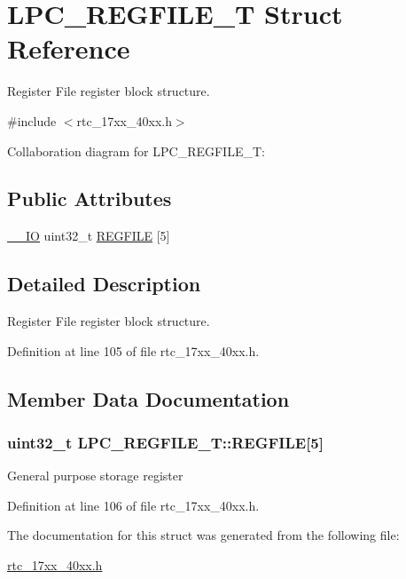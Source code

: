 \hypertarget{structLPC__REGFILE__T}{}\section{L\+P\+C\+\_\+\+R\+E\+G\+F\+I\+L\+E\+\_\+T Struct Reference}
\label{structLPC__REGFILE__T}


Register File register block structure.  




{\ttfamily \#include $<$rtc\+\_\+17xx\+\_\+40xx.\+h$>$}



Collaboration diagram for L\+P\+C\+\_\+\+R\+E\+G\+F\+I\+L\+E\+\_\+T\+:
\subsection*{Public Attributes}
\begin{DoxyCompactItemize}
\item 
\hyperlink{core__cm3_8h_aec43007d9998a0a0e01faede4133d6be}{\+\_\+\+\_\+\+IO} uint32\+\_\+t \hyperlink{structLPC__REGFILE__T_ae61f3de82503d032642cbdd27a4a160d}{R\+E\+G\+F\+I\+LE} \mbox{[}5\mbox{]}
\end{DoxyCompactItemize}


\subsection{Detailed Description}
Register File register block structure. 

Definition at line 105 of file rtc\+\_\+17xx\+\_\+40xx.\+h.



\subsection{Member Data Documentation}
\subsubsection[{\texorpdfstring{R\+E\+G\+F\+I\+LE}{REGFILE}}]{ uint32\+\_\+t L\+P\+C\+\_\+\+R\+E\+G\+F\+I\+L\+E\+\_\+\+T\+::\+R\+E\+G\+F\+I\+LE\mbox{[}5\mbox{]}}\hypertarget{structLPC__REGFILE__T_ae61f3de82503d032642cbdd27a4a160d}{}\label{structLPC__REGFILE__T_ae61f3de82503d032642cbdd27a4a160d}
General purpose storage register 

Definition at line 106 of file rtc\+\_\+17xx\+\_\+40xx.\+h.



The documentation for this struct was generated from the following file\+:\begin{DoxyCompactItemize}
\item 
\hyperlink{rtc__17xx__40xx_8h}{rtc\+\_\+17xx\+\_\+40xx.\+h}\end{DoxyCompactItemize}
